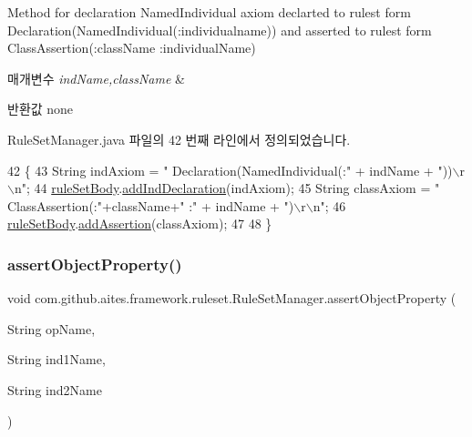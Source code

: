 Method for declaration Named\+Individual axiom declarted to rulest form Declaration(\+Named\+Individual(\+:individualname)) and asserted to rulest form Class\+Assertion(\+:class\+Name \+:individual\+Name) 


\begin{DoxyParams}{매개변수}
{\em ind\+Name,class\+Name} & \\
\hline
\end{DoxyParams}
\begin{DoxyReturn}{반환값}
none 
\end{DoxyReturn}


Rule\+Set\+Manager.\+java 파일의 42 번째 라인에서 정의되었습니다.


\begin{DoxyCode}
42                                                            \{
43         String indAxiom = \textcolor{stringliteral}{"    Declaration(NamedIndividual(:"} + indName + \textcolor{stringliteral}{"))\(\backslash\)r\(\backslash\)n"};
44         \mbox{\hyperlink{classcom_1_1github_1_1aites_1_1framework_1_1ruleset_1_1_rule_set_manager_a2218521e8abc1048bd369c7ed1c14c60}{ruleSetBody}}.\mbox{\hyperlink{classcom_1_1github_1_1aites_1_1framework_1_1ruleset_1_1_rule_set_body_ae179183b8a1b94076bedcb6c0cc178d5}{addIndDeclaration}}(indAxiom);
45         String classAxiom = \textcolor{stringliteral}{"    ClassAssertion(:"}+className+\textcolor{stringliteral}{" :"} + indName + \textcolor{stringliteral}{")\(\backslash\)r\(\backslash\)n"};
46         \mbox{\hyperlink{classcom_1_1github_1_1aites_1_1framework_1_1ruleset_1_1_rule_set_manager_a2218521e8abc1048bd369c7ed1c14c60}{ruleSetBody}}.\mbox{\hyperlink{classcom_1_1github_1_1aites_1_1framework_1_1ruleset_1_1_rule_set_body_ab9c0acf9f356fb04a249b1ea492b65c4}{addAssertion}}(classAxiom);        
47         
48     \}
\end{DoxyCode}
\mbox{\label{classcom_1_1github_1_1aites_1_1framework_1_1ruleset_1_1_rule_set_manager_ab36ee5e0e957168bb23480a202321f21}} 
\subsubsection{\texorpdfstring{assert\+Object\+Property()}{assertObjectProperty()}}
{\footnotesize\ttfamily void com.\+github.\+aites.\+framework.\+ruleset.\+Rule\+Set\+Manager.\+assert\+Object\+Property (\begin{DoxyParamCaption}\item[{String}]{op\+Name,  }\item[{String}]{ind1\+Name,  }\item[{String}]{ind2\+Name }\end{DoxyParamCaption})}




